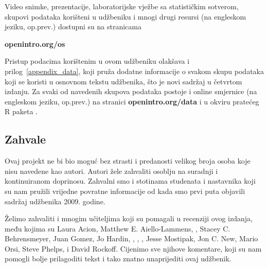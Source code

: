 Video snimke, prezentacije, laboratorijske vježbe sa statističkim sotverom,
skupovi podataka korišteni u udžbeniku i
mnogi drugi resursi (na engleskom jeziku, op.prev.) dostupni su na stranicama\\[-5mm]
\begin{center}
    {\color{black}\textbf{openintro.org/os}}
\end{center}
Pristup podacima korištenim u ovom udžbeniku olakšava i
prilog~\ref{appendix_data},
koji pruža dodatne informacije o svakom skupu podataka
koji se koristi u osnovnom tekstu udžbenika, što je novi sadržaj u četvrtom izdanju.
Za svaki od navedenih skupova podataka postoje i online smjernice (na engleskom jeziku, op.prev.) na stranici
    {\color{black}\textbf{openintro.org/data}}
i u okviru pratećeg R paketa
.
\vspace{3mm}

\subsection*{{\color{oiB}Zahvale}}
Ovaj projekt ne bi bio moguć bez strasti i predanosti 
velikog broja osoba koje nisu navedene kao autori.
Autori žele zahvaliti osoblju
na suradnji i kontinuiranom doprinosu.
Zahvalni smo i stotinama studenata i 
nastavnika koji su nam pružili vrijedne povratne informacije 
od kada smo prvi puta objavili sadržaj udžbenika 2009. godine. \vspace{3mm}

\noindent%
Želimo zahvaliti i mnogim učiteljima koji su pomagali u recenziji ovog izdanja, među kojima su
Laura Acion,
    {Matthew E. Aiello-Lammens},
,
Stacey C. Behrensmeyer,
Juan Gomez,
Jo Hardin,
,
,
,
Jesse Mostipak,
Jon C. New,
Mario Orsi,
Steve Phelps,
i David Rockoff.
Cijenimo sve njihove komentare, koji su nam pomogli bolje prilagoditi tekst i tako znatno unaprijediti ovaj udžbenik.
